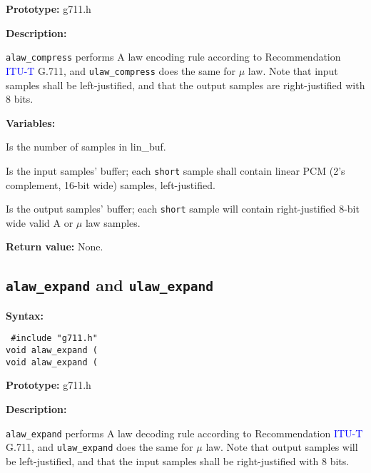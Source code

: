 {\bf Prototype: }       g711.h

{\bf Description: }

{\tt alaw\_compress} performs A law encoding rule according to
Recommendation \textcolor{blue}{ITU-T} G.711, and {\tt ulaw\_compress} does the same for $\mu$
law. Note that input samples shall be left-justified, and that the
output samples are right-justified with 8 bits.

{\bf Variables: }
\begin{Descr}{\DescrLen}
\item[\pbox{20mm}{\em smpno}] %
               Is the number of samples in lin\_buf.

\item[\pbox{20mm}{\em lin\_buf}] %
               Is the input samples' buffer; each {\tt short} sample 
               shall contain linear PCM (2's complement, 16-bit wide) 
               samples, left-justified.

\item[\pbox{20mm}{\em log\_buf}] %
               Is the output samples' buffer; each {\tt short} sample 
               will contain right-justified 8-bit wide valid A or $\mu$ 
               law samples. 
 
\end{Descr}
        
        {\bf Return value: }        None.


\subsection{{\tt alaw\_expand} and {\tt ulaw\_expand}}

{\bf Syntax: } 

{\tt
\#include "g711.h"\\
void alaw\_expand 
         (\\
void alaw\_expand 
         (
}

{\bf Prototype: }       g711.h

{\bf Description: }

{\tt alaw\_expand} performs A law decoding rule according to
Recommendation \textcolor{blue}{ITU-T} G.711, and {\tt ulaw\_expand} does the same for $\mu$
law. Note that output samples will be left-justified, and that the
input samples shall be right-justified with 8 bits.

